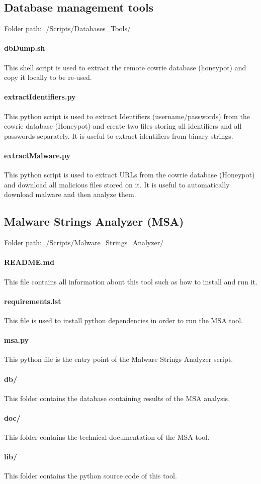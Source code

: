\subsection{Database management tools}

Folder path: ./Scripts/Databases\_Tools/

\paragraph{dbDump.sh}
This shell script is used to extract the remote cowrie database (honeypot) and copy it
locally to be re-used.

\paragraph{extractIdentifiers.py}
This python script is used to extract Identifiers (username/passwords) from the cowrie
database (Honeypot) and create two files storing all identifiers and all passwords
separately. It is useful to extract identifiers from binary strings.

\paragraph{extractMalware.py}
This python script is used to extract URLs from the cowrie database (Honeypot) and
download all malicious files stored on it. It is useful to automatically download
malware and then analyze them.

\subsection{Malware Strings Analyzer (MSA)}

Folder path: ./Scripts/Malware\_Strings\_Analyzer/

\paragraph{README.md}
This file contains all information about this tool such as how to install and run it.

\paragraph{requirements.lst}
This file is used to install python dependencies in order to run the MSA tool.

\paragraph{msa.py}
This python file is the entry point of the Malware Strings Analyzer script.

\paragraph{db/}
This folder contains the database containing results of the MSA analysis.

\paragraph{doc/}
This folder contains the technical documentation of the MSA tool.

\paragraph{lib/}
This folder contains the python source code of this tool.